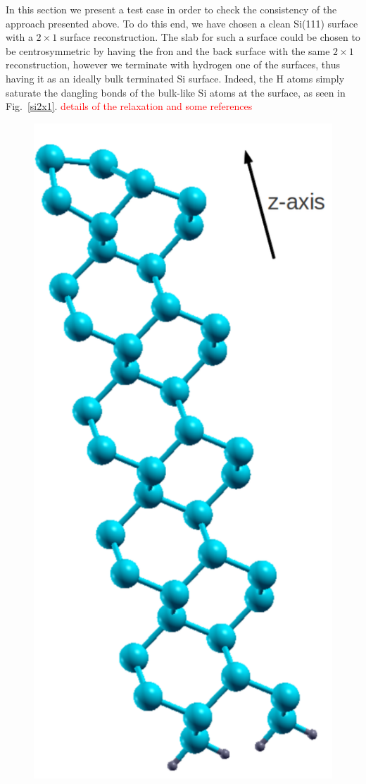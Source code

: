In this section we present a test case in order to check the
consistency of the approach presented above. To do this end,  we have chosen
a clean Si(111) surface  with a $2\times 1$ surface reconstruction.
The slab for such a surface could be chosen to be centrosymmetric 
by having the fron and the back surface with the same $2\times 1$
reconstruction, however we terminate with hydrogen one of the
surfaces, thus having it as an ideally bulk terminated Si
surface. Indeed, the H atoms simply saturate the dangling bonds of the
bulk-like Si atoms at the surface, as seen in Fig.~\ref{si2x1}. \textcolor{red}{details of the
 relaxation and some references}
\begin{figure}
\centering 
\includegraphics[scale=.3]{images/si2x1}

\end{figure}
